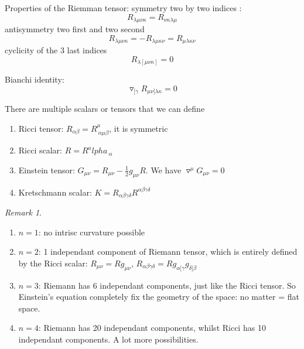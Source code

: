 \documentclass[a4paper]{book}
\theoremstyle{definition}
\theoremstyle{remark}
\newtheorem*{remark}{Remark}
\begin{document}
\noindent Properties of the Riemman tensor: \newline
symmetry two by two indices :
\begin{equation}
    R_{\lambda \mu\nu\kappa} = R_{\nu\kappa\lambda\mu}
\end{equation}
antisymmetry two first and two second
\begin{equation}
    R_{\lambda \mu\nu\kappa} = - R_{\lambda \mu\kappa\nu} = R_{\mu\lambda\kappa\nu}
\end{equation}
cyclicity of the 3 last indices
\begin{equation}
    R_{\lambda [\mu\nu\kappa]} = 0
\end{equation}

Bianchi identity:
\begin{equation}
    \triangledown_{[\gamma}R_{\mu\nu]\lambda\kappa} = 0
\end{equation}

There are multiple scalars or tensors that we can define 
\begin{enumerate}
    \item Ricci tensor: $R_{\alpha\beta} = R^\mu_{~\alpha\mu\beta}$, it is symmetric
    \item Ricci scalar: $R = R^alpha_{~\alpha}$
    \item Einstein tensor: $G_{\mu\nu} = R_{\mu\nu} - \frac{1}{2}g_{\mu\nu}R$. We have $\triangledown^\mu G_{\mu\nu} = 0$
    \item Kretschmann scalar: $K = R_{\alpha\beta\gamma\delta}R^{\alpha\beta\gamma\delta}$
\end{enumerate}

\begin{remark}
    \begin{enumerate}
        \item $n = 1$: no intrisc curvature possible 
        \item $n=2$: 1 independant component of Riemann tensor, which is entirely defined by the Ricci scalar: $R_{\mu\nu} = Rg_{\mu\nu}$, $R_{\alpha\beta\gamma\delta} = R g_{\alpha[\gamma}g_{\delta]\beta}$
        \item $n=3$: Riemann has 6 independant components, just like the Ricci tensor. So Einstein's equation completely fix the geometry of the space: no matter = flat space. 
        \item $n=4$: Riemann has 20 independant components, whilst Ricci has 10 independant components. A lot more possibilities. 
    \end{enumerate}
\end{remark}
\end{document}
